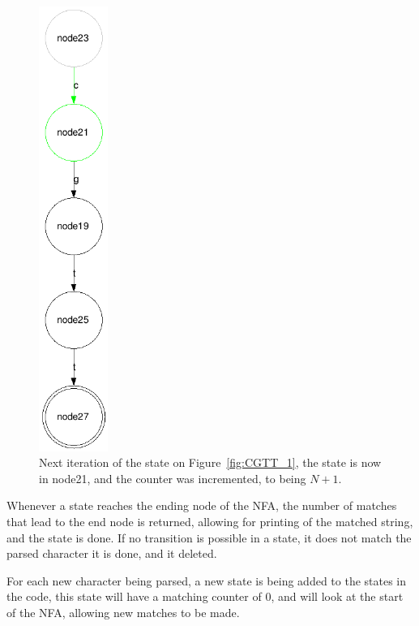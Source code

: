 \begin{figure}[h!]
\begin{minipage}[b]{0.45\linewidth}
\includegraphics[width=0.2\textwidth]{lib/cgtt2.png}
 \caption{Next iteration of the state on Figure~\ref{fig:CGTT_1}, the state is now in node21, and the counter was incremented, to being $N+1$.}
    \end{minipage}
\label{fig::cgtt}
\end{figure}

Whenever a state reaches the ending node of the NFA, the number of matches that lead to the end node is returned, allowing for printing of the matched string, and the state is done. If no transition is possible in a state, it does not match the parsed character it is done, and it deleted.

For each new character being parsed, a new state is being added to the states in the code, this state will have a matching counter of 0, and will look at the start of the NFA, allowing new matches to be made.

